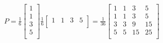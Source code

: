 \documentclass[10pt,twoside,reqno]{article}
\begin{document}
\begin{enumerate}
\begin{center}
$
P=\frac{1}{6}
\begin{bmatrix}
1\\
1\\
3\\
5\\
\end{bmatrix}
\frac{1}{6}
\begin{bmatrix}
1&1&3&5\\
\end{bmatrix}
=
\frac{1}{36}
\begin{bmatrix}
1&1&3&5\\
1&1&3&5\\
3&3&9&15\\
5&5&15&25\\
\end{bmatrix}
$ \\
\end{center}
\vspace{3mm}


\end{enumerate}
\end{document}
